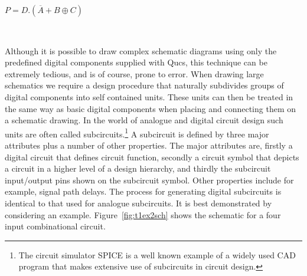 \begin{center}
\begin{large}$P=D.(\overline{A}+B \oplus C )$\end{large}
\end{center}

\begin{figure}
  \centering
{}
\end{figure}
\FloatBarrier

\begin{table}
  \centering
{}
\\
\end{table}
\FloatBarrier


Although it is possible to draw complex schematic diagrams using only
the predefined digital components supplied with Qucs, this technique
can be extremely tedious, and is of course, prone to error.  When
drawing large schematics we require a design procedure that naturally
subdivides groups of digital components into self contained units.
These units can then be treated in the same way as basic digital
components when placing and connecting them on a schematic drawing.
In the world of analogue and digital circuit design such units are
often called subcircuits.\footnote{The circuit simulator SPICE is a
well known example of a widely used CAD program that makes extensive
use of subcircuits in circuit design.}  A subcircuit is defined by
three major attributes plus a number of other properties. The major
attributes are, firstly a digital circuit that defines circuit
function, secondly a circuit symbol that depicts a circuit in a higher
level of a design hierarchy, and thirdly the subcircuit input/output
pins shown on the subcircuit symbol.  Other properties include for
example, signal path delays. The process for generating digital
subcircuits is identical to that used for analogue subcircuits.  It is
best demonstrated by considering an example.
Figure~\ref{fig:t1ex2sch} shows the schematic for a four input
combinational circuit.

